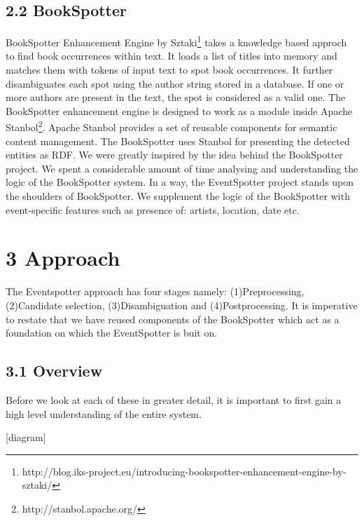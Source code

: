 \documentclass[a4paper,11pt]{report}
\begin{document}
\section*{2.2 BookSpotter}

BookSpotter Enhancement Engine by Sztaki\footnote{http://blog.iks-project.eu/introducing-bookspotter-enhancement-engine-by-sztaki/} takes a knowledge based approch to find book occurrences within text. It loads a list of titles into memory and matches them with tokens of input text to spot book occurrences. It further disambiguates each spot using the author string stored in a database. If one or more authors are present in the text, the spot is considered as a valid one. The BookSpotter enhancement engine is designed to work as a module inside Apache Stanbol\footnote{http://stanbol.apache.org/}. Apache Stanbol provides a set of reusable components for semantic content management. The BookSpotter uses Stanbol for presenting the detected entities as RDF. We were greatly inspired by the idea behind the BookSpotter project. We spent a considerable amount of time  analysing and understanding the logic of the BookSpotter system. In a way, the EventSpotter project stands upon the shoulders of BookSpotter. We supplement the logic of the BookSpotter with event-specific features such as presence of: artists, location, date etc.



\chapter*{3 Approach}
The Eventspotter approach has four stages namely: (1)Preprocessing, (2)Candidate selection, (3)Disambiguation and (4)Postprocessing. It is imperative to restate that we have reused components of the BookSpotter which act as a foundation on which the EventSpotter is buit on.
\section*{3.1 Overview}
Before we look at each of these in greater detail, it is important to first gain a high level understanding of the entire system.

[diagram]
\end{document}
